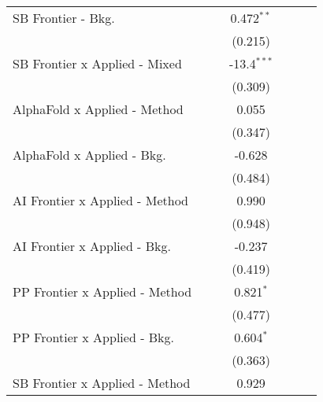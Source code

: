 \begin{tabular}{lcccccc}
   SB Frontier - Bkg.             &                &               & 0.472$^{**}$   &               &        &   \\   
                                  &                &               & (0.215)        &               &        &   \\   
   SB Frontier x Applied - Mixed  &                &               & -13.4$^{***}$  &               &        &   \\   
                                  &                &               & (0.309)        &               &        &   \\   
   AlphaFold x Applied - Method   &                &               & 0.055          &               &        &   \\   
                                  &                &               & (0.347)        &               &        &   \\   
   AlphaFold x Applied - Bkg.     &                &               & -0.628         &               &        &   \\   
                                  &                &               & (0.484)        &               &        &   \\   
   AI Frontier x Applied - Method &                &               & 0.990          &               &        &   \\   
                                  &                &               & (0.948)        &               &        &   \\   
   AI Frontier x Applied - Bkg.   &                &               & -0.237         &               &        &   \\   
                                  &                &               & (0.419)        &               &        &   \\   
   PP Frontier x Applied - Method &                &               & 0.821$^{*}$    &               &        &   \\   
                                  &                &               & (0.477)        &               &        &   \\   
   PP Frontier x Applied - Bkg.   &                &               & 0.604$^{*}$    &               &        &   \\   
                                  &                &               & (0.363)        &               &        &   \\   
   SB Frontier x Applied - Method &                &               & 0.929          &               &        &   \\   

\end{tabular}
